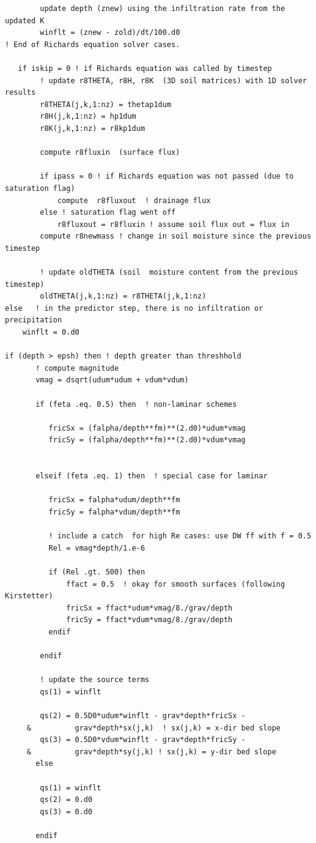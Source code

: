 \documentclass{article}
\begin{document}
\begin{lstlisting}
	    update depth (znew) using the infiltration rate from the updated K  
	    winflt = (znew - zold)/dt/100.d0
! End of Richards equation solver cases.

   if iskip = 0 ! if Richards equation was called by timestep
   		! update r8THETA, r8H, r8K  (3D soil matrices) with 1D solver results
   		r8THETA(j,k,1:nz) = thetap1dum  
        r8H(j,k,1:nz) = hp1dum
        r8K(j,k,1:nz) = r8kp1dum
   		
   		compute r8fluxin  (surface flux)
   		
   		if ipass = 0 ! if Richards equation was not passed (due to saturation flag)
			compute  r8fluxout  ! drainage flux		
		else ! saturation flag went off
		    r8fluxout = r8fluxin ! assume soil flux out = flux in
		compute r8newmass ! change in soil moisture since the previous timestep
		
		! update oldTHETA (soil  moisture content from the previous timestep)
		oldTHETA(j,k,1:nz) = r8THETA(j,k,1:nz)    
else   ! in the predictor step, there is no infiltration or precipitation
	winflt = 0.d0 

if (depth > epsh) then ! depth greater than threshhold
       ! compute magnitude
       vmag = dsqrt(udum*udum + vdum*vdum) 

       if (feta .eq. 0.5) then  ! non-laminar schemes
          
          fricSx = (falpha/depth**fm)**(2.d0)*udum*vmag 
          fricSy = (falpha/depth**fm)**(2.d0)*vdum*vmag 


       elseif (feta .eq. 1) then  ! special case for laminar 
        
          fricSx = falpha*udum/depth**fm 
          fricSy = falpha*vdum/depth**fm 
          
          ! include a catch  for high Re cases: use DW ff with f = 0.5   
          Rel = vmag*depth/1.e-6   
          
          if (Rel .gt. 500) then 
              ffact = 0.5  ! okay for smooth surfaces (following Kirstetter)
              fricSx = ffact*udum*vmag/8./grav/depth
              fricSy = ffact*vdum*vmag/8./grav/depth      
          endif
          
        endif
		
		! update the source terms
        qs(1) = winflt
          
        qs(2) = 0.5D0*udum*winflt - grav*depth*fricSx -  
     &          grav*depth*sx(j,k)  ! sx(j,k) = x-dir bed slope
        qs(3) = 0.5D0*vdum*winflt - grav*depth*fricSy - 
     &          grav*depth*sy(j,k) ! sx(j,k) = y-dir bed slope
       else
          
        qs(1) = winflt
        qs(2) = 0.d0
        qs(3) = 0.d0
        
       endif	
	
\end{lstlisting}
\end{document}
